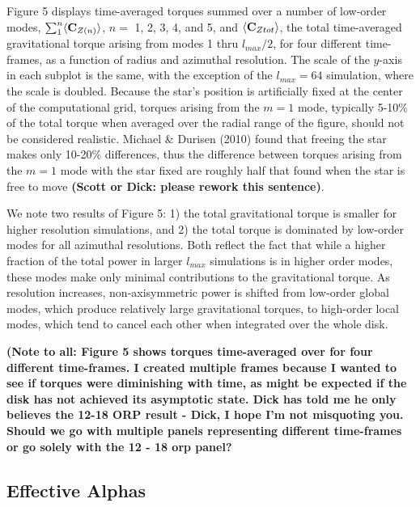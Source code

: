 \documentclass[manuscript]{aastex} %
\begin{document}
Figure 5  displays 
 time-averaged torques summed over a number of low-order modes, $\sum_1^n \langle {\rm \bf C}_{Z(n)} \rangle$, $n = $ 1, 2, 3, 4, and 5, and $\langle {\rm \bf C}_{Ztot} \rangle$,
the total time-averaged gravitational torque arising from modes 1 thru $l_{max}/2$, for four different time-frames,
as a function of radius and azimuthal resolution. 
The scale of the $y$-axis in each subplot is the same, with the exception of the $l_{max} = 64$ simulation, 
where the scale is doubled.  
Because the star's position is artificially fixed at the center of the computational grid, 
torques arising from the $m=1$ mode,
typically 5-10\% of the total torque when averaged over the radial range of the figure,
should not be considered realistic.  
Michael \& Durisen (2010) found that freeing the star makes only 10-20\%
differences,  thus the difference between torques arising from the $m=1$ mode with the star fixed are roughly half that found when the star is free to move {\bf (Scott or Dick: please rework this sentence)}. 

We note two results of Figure 5: 1) the total gravitational torque is smaller for higher resolution simulations, and 2) the total torque is dominated by low-order modes for all azimuthal resolutions. Both reflect the fact that while a higher fraction of the total power in larger $l_{max}$ simulations is in higher order modes, these modes make only minimal contributions to the gravitational torque. As resolution increases, non-axisymmetric power is shifted from low-order global modes, which produce relatively large gravitational torques, to high-order local modes, which tend to cancel each other when integrated over the whole disk. 

{\bf (Note to all: Figure 5 shows torques
time-averaged over for four different time-frames.  I created multiple frames because I wanted to see if torques were 
diminishing with time, as might be expected if the disk has not achieved its asymptotic state.  
Dick has told me he only believes the 12-18 ORP result - Dick, I hope 
I'm not misquoting you. Should we go with multiple panels representing different time-frames or 
go solely with the 12 - 18 orp panel?
} 

\subsection{Effective Alphas}
\end{document}
